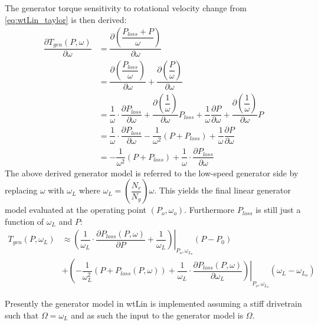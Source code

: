 The generator torque sensitivity to rotational velocity change from \cref{eq:wtLin_taylor} is then derived:
\begin{align}
	\dfrac{\partial T_{gen}(P, \omega)}{\partial \omega} & = \dfrac{\partial \left (\dfrac{P_{loss} +  P}{\omega}\right )}{\partial \omega} \\
	& = \dfrac{\partial \left (\dfrac{P_{loss}}{\omega} \right )}{\partial \omega} + \dfrac{\partial \left (\dfrac{P}{\omega} \right )}{\partial \omega} \\
	& = \dfrac{1}{\omega} \cdot \dfrac{\partial P_{loss}}{\partial \omega} + \dfrac{\partial \left (\dfrac{1}{\omega} \right)}{\partial \omega} P_{loss} + \dfrac{1}{\omega} \dfrac{\partial P}{\partial \omega} + \dfrac{\partial \left (\dfrac{1}{\omega} \right )}{\partial \omega} P \\
	& = \dfrac{1}{\omega} \cdot  \dfrac{\partial P_{loss}}{\partial \omega} - \dfrac{1}{\omega^2}(P + P_{loss}) + \dfrac{1}{\omega} \dfrac{\partial P}{\partial \omega} \\
	& = -\dfrac{1}{\omega^2}(P + P_{loss}) + \dfrac{1}{\omega} \cdot \dfrac{\partial P_{loss}}{\partial \omega}
\end{align}
The above derived generator model is referred to the low-speed generator side by replacing $ \omega $ with $ \omega_L $ where $ \omega_L = \left (\dfrac{N_r}{N_g} \right ) \omega $. This yields the final linear generator model evaluated at the operating point $ (P_o, \omega_o) $. Furthermore $P_{loss}$ is still just a function of $ \omega_L $ and $ P $:
\begin{equation}
	\begin{split}
		T_{gen}(P, \omega_L) 	& \approx \left. \left ( \dfrac{1}{\omega_L} \cdot \dfrac{\partial P_{loss}(P, \omega)}{\partial P} + \dfrac{1}{\omega_L} \right ) \right |_{P_o,\omega_{L_o}} (P - P_0) \\ 
		& + \left ( -\dfrac{1}{\omega_L^2}(P + P_{loss}(P, \omega)) + \left. \dfrac{1}{\omega_L} \cdot \dfrac{\partial P_{loss}(P, \omega)}{\partial \omega_L} \right ) \right |_{P_o,\omega_{L_o}} (\omega_L - \omega_{L_o})
	\end{split}
\end{equation}


Presently the generator model in wtLin is implemented assuming a stiff drivetrain such that $ \Omega = \omega_L $ and as such the input to the generator model is $ \Omega $.  


